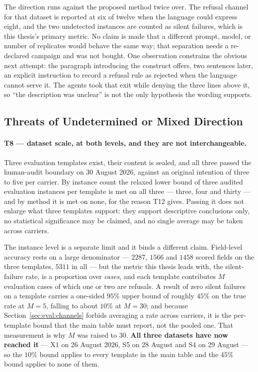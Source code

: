 The direction runs against the proposed method twice over. The refusal channel for that dataset
is reported at six of twelve when the language could express eight, and the two undetected
instances are counted as silent failures, which is this thesis's primary metric. No claim is
made that a different prompt, model, or number of replicates would behave the same way; that
separation needs a re-declared campaign and was not bought. One observation constrains the
obvious next attempt: the paragraph introducing the construct offers, two sentences later, an
explicit instruction to record a refusal rule as rejected when the language cannot serve it.
The agents took that exit while denying the three lines above it, so ``the description was
unclear'' is not the only hypothesis the wording supports.

\subsection{Threats of Undetermined or Mixed Direction}
\label{sec:eval:threats:mixed}

\paragraph{T8 --- dataset scale, at both levels, and they are not interchangeable.}
Three evaluation templates exist, their content is sealed, and all three passed the
human-audit boundary on 30 August 2026, against an original intention of three to five per
carrier. By instance count the relaxed lower bound of three audited evaluation instances per
template is met on all three --- three, four and thirty --- and by method it is met on none,
for the reason T12 gives. Passing it does not enlarge what three templates support: they
support descriptive conclusions only, no statistical significance may be claimed, and no
single average may be taken across carriers.

The instance level is a separate limit and it binds a different claim. Field-level accuracy
rests on a large denominator --- $2287$, $1566$ and $1458$ scored fields on the three
templates, $5311$ in all --- but the metric this thesis leads with, the silent-failure rate,
is a proportion over \emph{cases}, and each template contributes $M$ evaluation cases of which one
or two are refusals. A result of zero silent failures on a template carries a one-sided $95\%$
upper bound of roughly $45\%$ on the true rate at $M=5$, falling to about $10\%$ at $M=30$;
and because Section~\ref{sec:eval:channels} forbids averaging a rate across carriers, it is
the per-template bound that the main table must report, not the pooled one. That measurement
is why $M$ was raised to $30$. \textbf{All three datasets have now reached it} --- X1 on
26 August 2026, S5 on 28 August and S4 on 29 August --- so the $10\%$ bound applies to every
template in the main table and the $45\%$ bound applies to none of them.


